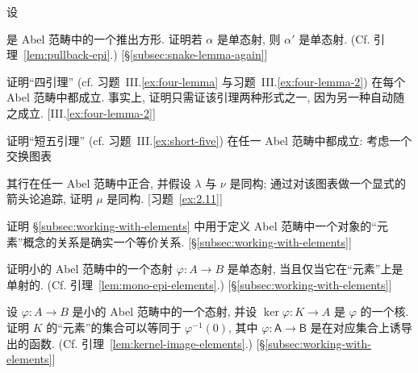 \begin{prob}\label{ex:2.2}
设
\begin{center}
\end{center}
是 Abel 范畴中的一个推出方形. 证明若 $\alpha$ 是单态射, 则 $\alpha'$ 是单态射. (Cf. 引理~\ref{lem:pullback-epi}.) [\S\ref{subsec:snake-lemma-again}]
\end{prob}

\begin{prob}\label{ex:2.3}
证明``四引理'' (cf. 习题~III.\ref{ex:four-lemma} 与习题~III.\ref{ex:four-lemma-2}) 在每个 Abel 范畴中都成立. 事实上, 证明只需证该引理两种形式之一, 因为另一种自动随之成立. [III.\ref{ex:four-lemma-2}]
\end{prob}

\begin{prob}\label{ex:2.4}
证明``短五引理'' (cf. 习题~III.\ref{ex:short-five}) 在任一 Abel 范畴中都成立: 考虑一个交换图表
\begin{center}
\end{center}
其行在任一 Abel 范畴中正合, 并假设 $\lambda$ 与 $\nu$ 是同构; 通过对该图表做一个显式的箭头论追踪, 证明 $\mu$ 是同构. [习题~\ref{ex:2.11}]
\end{prob}

\begin{prob}\label{ex:2.5}
证明 \S\ref{subsec:working-with-elements} 中用于定义 Abel 范畴中一个对象的``元素''概念的关系是确实一个等价关系. [\S\ref{subsec:working-with-elements}]
\end{prob}

\begin{prob}\label{ex:2.6}
证明小的 Abel 范畴中的一个态射 $\varphi:A\to B$ 是单态射, 当且仅当它在``元素''上是单射的. (Cf. 引理~\ref{lem:mono-epi-elements}.) [\S\ref{subsec:working-with-elements}]
\end{prob}

\begin{prob}\label{ex:2.7}
设 $\varphi:A\to B$ 是小的 Abel 范畴中的一个态射, 并设 $\ker\varphi:K\to A$ 是 $\varphi$ 的一个核. 证明 $K$ 的``元素''的集合可以等同于 $\varphi^{-1}(0)$, 其中 $\varphi:\mathsf{A}\to\mathsf{B}$ 是在对应集合上诱导出的函数. (Cf. 引理~\ref{lem:kernel-image-elements}.) [\S\ref{subsec:working-with-elements}]
\end{prob}

